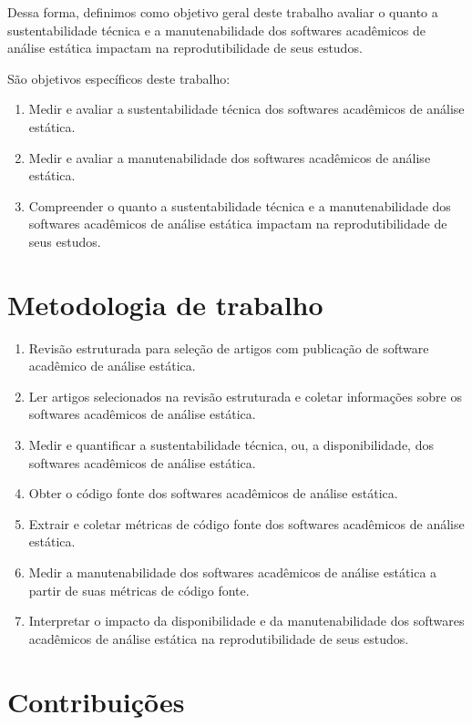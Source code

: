 Dessa forma, definimos como objetivo geral deste trabalho avaliar o quanto a
sustentabilidade técnica e a manutenabilidade dos softwares acadêmicos de
análise estática impactam na reprodutibilidade de seus estudos.

São objetivos específicos deste trabalho:

\begin{enumerate}
  \item Medir e avaliar a sustentabilidade técnica dos softwares acadêmicos de
        análise estática.
  \item Medir e avaliar a manutenabilidade dos softwares acadêmicos de análise
        estática.
  \item Compreender o quanto a sustentabilidade técnica e a manutenabilidade
        dos softwares acadêmicos de análise estática impactam na
        reprodutibilidade de seus estudos.
\end{enumerate}

\section{Metodologia de trabalho}

\begin{enumerate}
  \item Revisão estruturada para seleção de artigos com publicação de software
        acadêmico de análise estática.
  \item Ler artigos selecionados na revisão estruturada e coletar informações sobre
        os softwares acadêmicos de análise estática.
  \item Medir e quantificar a sustentabilidade técnica, ou, a disponibilidade, dos
        softwares acadêmicos de análise estática.
  \item Obter o código fonte dos softwares acadêmicos de análise estática.
  \item Extrair e coletar métricas de código fonte dos softwares acadêmicos de
        análise estática.
  \item Medir a manutenabilidade dos softwares acadêmicos de análise estática
        a partir de suas métricas de código fonte.
  \item Interpretar o impacto da disponibilidade e da manutenabilidade dos softwares
        acadêmicos de análise estática na reprodutibilidade de seus estudos.
\end{enumerate}

\section{Contribuições}

